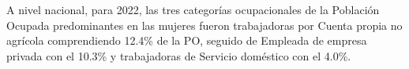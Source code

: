  A nivel nacional, para 2022, las tres categorías ocupacionales de la Población Ocupada predominantes en las mujeres fueron trabajadoras por Cuenta propia no agrícola comprendiendo 12.4\% de la PO, seguido de Empleada de empresa privada con el 10.3\% y trabajadoras de Servicio doméstico con el 4.0\%.
